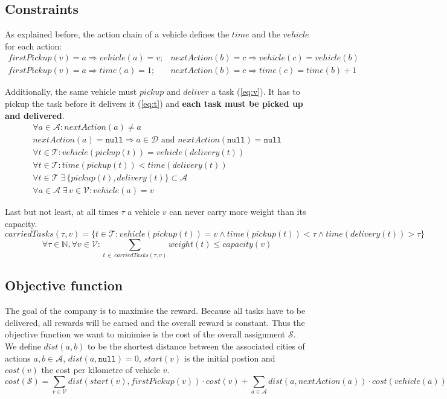 \documentclass[11pt]{article}
\begin{document}
 \subsection{Constraints}
 As explained before, the action chain of a vehicle defines the $time$
 and the $vehicle$ for each action:
 \begin{eqnarray}
  firstPickup(v) = a \Rightarrow vehicle(a) = v;  &
  nextAction(b)  = c \Rightarrow vehicle(c) = vehicle(b)
  \\
  firstPickup(v) = a \Rightarrow time(a) = 1;  &
  nextAction(b)  = c \Rightarrow time(c) = time(b) + 1
 \end{eqnarray}

 Additionally, the same vehicle must $pickup$ and $deliver$ a task (\ref{eq:v}).
 It has to pickup the task before it delivers it (\ref{eq:t})
 and \textbf{each task must be picked up and delivered}.
 \begin{eqnarray}
  \forall a \in \mathcal{A}  :
  nextAction(a) \neq a
  \\
  nextAction(a) = \mathtt{null} \Rightarrow a \in \mathcal{D}
  \text{ and } nextAction(\mathtt{null}) = \mathtt{null}
  \\
  \label{eq:v}
  \forall t \in \mathcal{T}:
  vehicle(pickup(t)) = vehicle(delivery(t))
  \\
  \label{eq:t}
  \forall t \in \mathcal{T}:
  time(pickup(t)) < time(delivery(t))
  \\
  \forall t \in \mathcal{T} \;
  \exists  \, \{ pickup(t), delivery(t) \} \subset \mathcal{A} \;\;
  \\
  \forall a \in \mathcal{A} \;
  \exists \, v \in \mathcal{V} :
  vehicle(a) = v
 \end{eqnarray}

 Last but not least, at all times $\tau$ a vehicle $v$ can never
 carry more weight than its capacity.
 $$
 carriedTasks(\tau, v) = \{t \in \mathcal{T}:
 vehicle(pickup(t)) = v \wedge
 time(pickup(t)) < \tau \wedge
 time(delivery(t)) > \tau \}
 $$$$
 \forall \tau \in \mathbb{N},
 \forall v \in \mathcal{V}:
 \sum_{t \, \in \, carriedTasks(\tau, v)} weight(t) \leq
 capacity(v)
 $$

 \subsection{Objective function}

 The goal of the company is to maximise the reward. Because all tasks have to be
 delivered, all rewards will be earned and the overall reward is constant. Thus
 the objective function we want to minimise is the cost of the overall assignment
 $\mathcal{S}$. We define $dist(a,b)$ to be the shortest distance between the
 associated cities of actions $a,b \in \mathcal{A}$, $dist(a, \mathtt{null}) =
 0$, $start(v)$ is the initial postion and $cost(v)$ the cost per kilometre of
 vehicle $v$.
 $$
 cost(\mathcal{S}) =
 \sum_{v \in \mathcal{V}} dist(start(v), firstPickup(v))
 \cdot cost(v)
 +
 \sum_{a \in \mathcal{A}} dist(a, nextAction(a))
 \cdot cost(vehicle(a))
 $$
\end{document}
